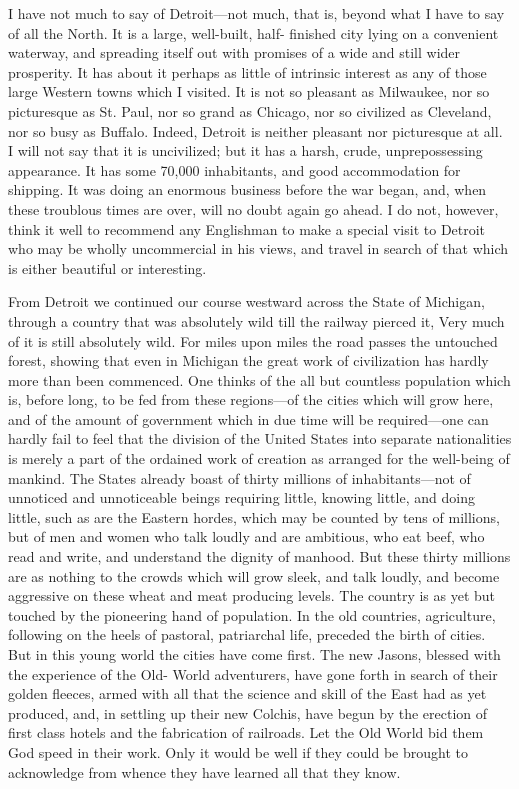I have not much to say of Detroit---not much, that is, beyond what I
have to say of all the North.  It is a large, well-built, half-
finished city lying on a convenient waterway, and spreading itself
out with promises of a wide and still wider prosperity.  It has
about it perhaps as little of intrinsic interest as any of those
large Western towns which I visited.  It is not so pleasant as
Milwaukee, nor so picturesque as St. Paul, nor so grand as Chicago,
nor so civilized as Cleveland, nor so busy as Buffalo.  Indeed,
Detroit is neither pleasant nor picturesque at all.  I will not say
that it is uncivilized; but it has a harsh, crude, unprepossessing
appearance.  It has some 70,000 inhabitants, and good accommodation
for shipping.  It was doing an enormous business before the war
began, and, when these troublous times are over, will no doubt
again go ahead.  I do not, however, think it well to recommend any
Englishman to make a special visit to Detroit who may be wholly
uncommercial in his views, and travel in search of that which is
either beautiful or interesting.

From Detroit we continued our course westward across the State of
Michigan, through a country that was absolutely wild till the
railway pierced it, Very much of it is still absolutely wild.  For
miles upon miles the road passes the untouched forest, showing that
even in Michigan the great work of civilization has hardly more
than been commenced.  One thinks of the all but countless
population which is, before long, to be fed from these regions---of
the cities which will grow here, and of the amount of government
which in due time will be required---one can hardly fail to feel
that the division of the United States into separate nationalities
is merely a part of the ordained work of creation as arranged for
the well-being of mankind.  The States already boast of thirty
millions of inhabitants---not of unnoticed and unnoticeable beings
requiring little, knowing little, and doing little, such as are the
Eastern hordes, which may be counted by tens of millions, but of
men and women who talk loudly and are ambitious, who eat beef, who
read and write, and understand the dignity of manhood.  But these
thirty millions are as nothing to the crowds which will grow sleek,
and talk loudly, and become aggressive on these wheat and meat
producing levels.  The country is as yet but touched by the
pioneering hand of population.  In the old countries, agriculture,
following on the heels of pastoral, patriarchal life, preceded the
birth of cities.  But in this young world the cities have come
first.  The new Jasons, blessed with the experience of the Old-
World adventurers, have gone forth in search of their golden
fleeces, armed with all that the science and skill of the East had
as yet produced, and, in settling up their new Colchis, have begun
by the erection of first class hotels and the fabrication of
railroads.  Let the Old World bid them God speed in their work.
Only it would be well if they could be brought to acknowledge from
whence they have learned all that they know.

